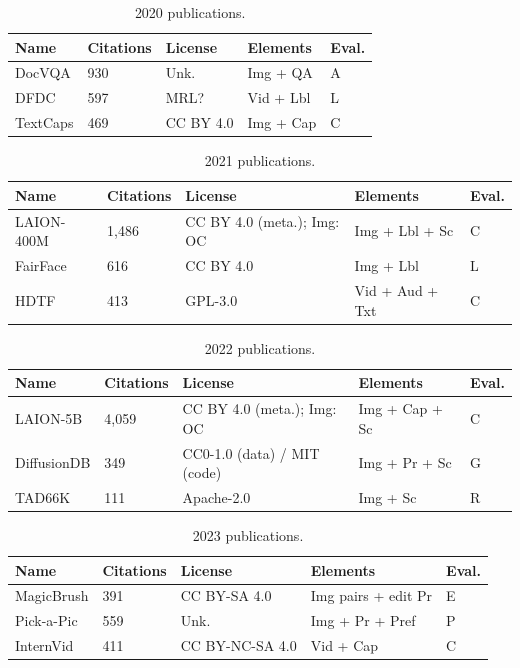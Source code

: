 \documentclass{article}
\begin{document}
\begin{table}[H]
\centering
\caption{2020 publications.}
\begin{tabular}{p{2.5cm}p{1.65cm}p{3.05cm}p{3.2cm}p{2.15cm}}
\hline
\textbf{Name} & \textbf{Citations} & \textbf{License} & \textbf{Elements} & \textbf{Eval.}\\
\hline
DocVQA & 930 & Unk. & Img + QA & A\\
\hline
DFDC & 597 & MRL? & Vid + Lbl & L\\
\hline
TextCaps & 469 & CC BY 4.0 & Img + Cap & C\\
\hline

\end{tabular}
\end{table}

\begin{table}[H]
\centering
\caption{2021 publications.}
\begin{tabular}{p{2.5cm}p{1.65cm}p{3.05cm}p{3.2cm}p{2.15cm}}
\hline
\textbf{Name} & \textbf{Citations} & \textbf{License} & \textbf{Elements} & \textbf{Eval.}\\
\hline
LAION-400M & 1,486 & CC BY 4.0 (meta.); Img: OC & Img + Lbl + Sc & C\\
\hline
FairFace & 616 & CC BY 4.0 & Img + Lbl & L\\
\hline
HDTF & 413 & GPL-3.0 & Vid + Aud + Txt & C\\
\hline

\end{tabular}
\end{table}

\begin{table}[H]
\centering
\caption{2022 publications.}
\begin{tabular}{p{2.5cm}p{1.65cm}p{3.05cm}p{3.2cm}p{2.15cm}}
\hline
\textbf{Name} & \textbf{Citations} & \textbf{License} & \textbf{Elements} & \textbf{Eval.}\\
\hline
LAION-5B & 4,059 & CC BY 4.0 (meta.); Img: OC & Img + Cap + Sc & C\\
\hline
DiffusionDB & 349 & CC0-1.0 (data) / MIT (code) & Img + Pr + Sc & G\\
\hline
TAD66K & 111 & Apache-2.0 & Img + Sc & R\\
\hline

\end{tabular}
\end{table}

\begin{table}[H]
\centering
\caption{2023 publications.}
\begin{tabular}{p{2.5cm}p{1.65cm}p{3.05cm}p{3.2cm}p{2.15cm}}
\hline
\textbf{Name} & \textbf{Citations} & \textbf{License} & \textbf{Elements} & \textbf{Eval.}\\
\hline
MagicBrush & 391 & CC BY-SA 4.0 & Img pairs + edit Pr & E\\
\hline
Pick-a-Pic & 559 & Unk. & Img + Pr + Pref & P\\
\hline
InternVid & 411 & CC BY-NC-SA 4.0 & Vid + Cap & C\\
\hline

\end{tabular}
\end{table}
\end{document}

